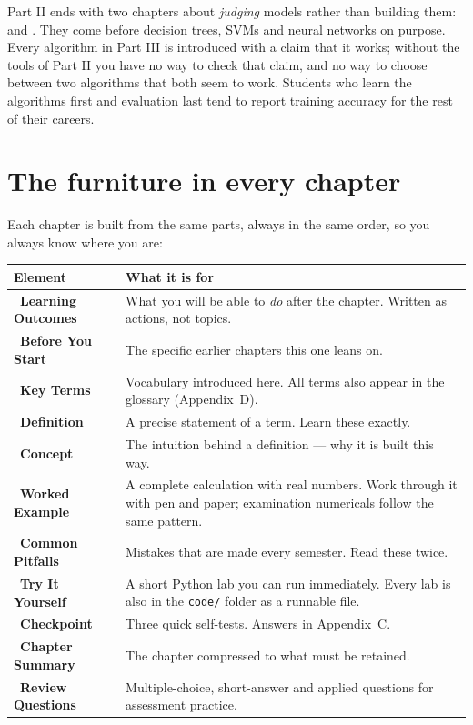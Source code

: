 \begin{conceptbox}
Part II ends with two chapters about \emph{judging} models rather than building
them:  and . They come before decision
trees, SVMs and neural networks on purpose. Every algorithm in Part III is
introduced with a claim that it works; without the tools of Part II you have no
way to check that claim, and no way to choose between two algorithms that both
seem to work. Students who learn the algorithms first and evaluation last tend
to report training accuracy for the rest of their careers.
\end{conceptbox}

\section*{The furniture in every chapter}

Each chapter is built from the same parts, always in the same order, so you
always know where you are:

\begin{longtable}{@{}L{4.6cm}L{10.6cm}@{}}
\toprule
{}
\textbf{Element} & \textbf{What it is for} \\
\midrule
\endhead
{}~\textbf{Learning Outcomes} & What you will be able to \emph{do} after the chapter. Written as actions, not topics. \\
~\textbf{Before You Start} & The specific earlier chapters this one leans on. \\
~\textbf{Key Terms} & Vocabulary introduced here. All terms also appear in the glossary (Appendix~D). \\
~\textbf{Definition} & A precise statement of a term. Learn these exactly. \\
~\textbf{Concept} & The intuition behind a definition --- why it is built this way. \\
~\textbf{Worked Example} & A complete calculation with real numbers. Work through it with pen and paper; examination numericals follow the same pattern. \\
~\textbf{Common Pitfalls} & Mistakes that are made every semester. Read these twice. \\
~\textbf{Try It Yourself} & A short Python lab you can run immediately. Every lab is also in the \texttt{code/} folder as a runnable file. \\
~\textbf{Checkpoint} & Three quick self-tests. Answers in Appendix~C. \\
~\textbf{Chapter Summary} & The chapter compressed to what must be retained. \\
~\textbf{Review Questions} & Multiple-choice, short-answer and applied questions for assessment practice. \\
\bottomrule
\end{longtable}

